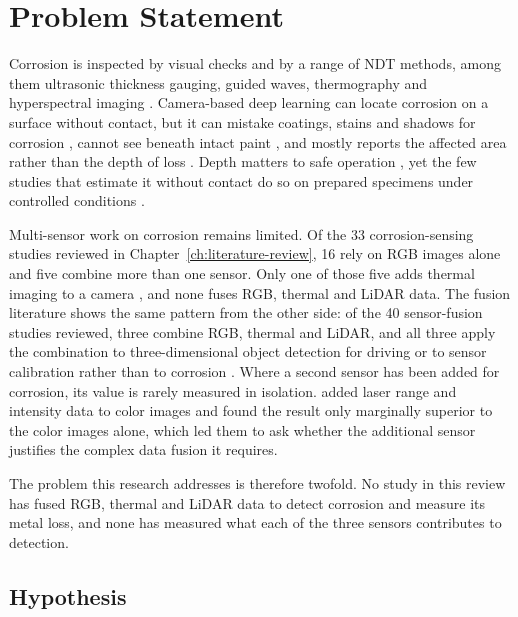 \section{Problem Statement}
\label{sec:problem-statement}

Corrosion is inspected by visual checks and by a range of NDT methods, among
them ultrasonic thickness gauging, guided waves, thermography and hyperspectral
imaging \citep{Elizalde2023,Egodawela2025,Ding2025,Arias2025}. Camera-based
deep learning can locate corrosion on a surface without contact, but it can
mistake coatings, stains and shadows for corrosion
\citep{Espinoza2026,Lavadiya2022}, cannot see beneath intact paint
\citep{Elizalde2023,Hernndez-Surez2026}, and mostly reports the affected area
rather than the depth of loss \citep{Alvani2026,Savino2025}. Depth matters to
safe operation \citep{Akhlaghi2023,Huang2026a}, yet the few studies that
estimate it without contact do so on prepared specimens under controlled
conditions \citep{Egodawela2025,Doshvarpassand2022,Haitz2022,Maru2025}.

Multi-sensor work on corrosion remains limited. Of the 33 corrosion-sensing
studies reviewed in Chapter~\ref{ch:literature-review}, 16 rely on RGB images
alone and five combine more than one sensor. Only one of those five adds
thermal imaging to a camera \citep{Lim2021}, and none fuses RGB, thermal and
LiDAR data. The fusion literature shows the same pattern from the other side:
of the 40 sensor-fusion studies reviewed, three combine RGB, thermal and LiDAR,
and all three apply the combination to three-dimensional object detection for
driving or to sensor calibration rather than to corrosion
\citep{Tran2025,Tran2024,Yang2024}. Where a second sensor has been added for
corrosion, its value is rarely measured in isolation. \citet{Haitz2022} added
laser range and intensity data to color images and found the result only
marginally superior to the color images alone, which led them to ask whether
the additional sensor justifies the complex data fusion it requires.

The problem this research addresses is therefore twofold. No study in this
review has fused RGB, thermal and LiDAR data to detect corrosion and measure
its metal loss, and none has measured what each of the three sensors
contributes to detection.

\subsection*{Hypothesis}

